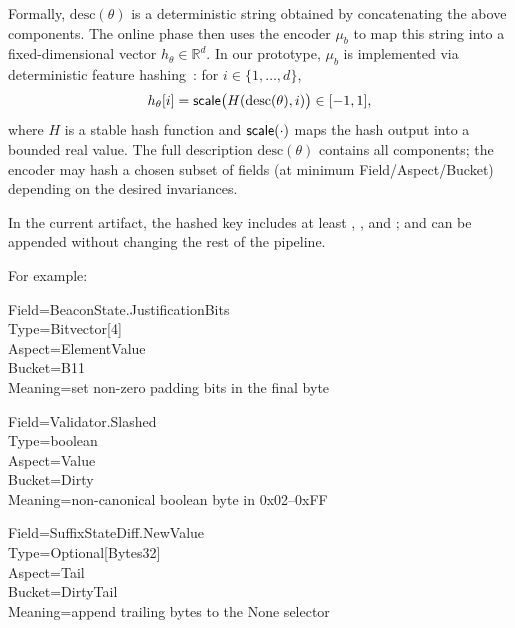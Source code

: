 Formally, $\text{desc}(\theta)$ is a deterministic string obtained by concatenating the above components.
The online phase then uses the encoder $\mu_b$ to map this string into a fixed-dimensional vector $h_\theta \in \mathbb{R}^d$.
In our prototype, $\mu_b$ is implemented via deterministic feature hashing~\cite{weinberger2009featurehashing}: for $i\in\{1,\ldots,d\}$,
\[
    h_\theta[i] = {\sf scale}\big(H(\text{desc}(\theta), i)\big) \in [-1,1],
\]
where $H$ is a stable hash function and ${\sf scale}(\cdot)$ maps the hash output into a bounded real value. The full description $\text{desc}(\theta)$ contains all components; the encoder may hash a chosen subset of fields (at minimum Field/Aspect/Bucket) depending on the desired invariances.

In the current artifact, the hashed key includes at least , , and ;  and  can be appended without changing the rest of the pipeline.

For example:

\begin{mdframed}[
    backgroundcolor=gray!10,
    linecolor=white,
    skipabove=0.3em,
    skipbelow=0.2em
    ]
\noindent\ttfamily\small
Field=BeaconState.\allowbreak JustificationBits \\
Type=Bitvector[4] \\
Aspect=ElementValue \\
Bucket=B11 \\
Meaning=set non-zero padding bits in the final byte
\end{mdframed}

\begin{mdframed}[
    backgroundcolor=gray!10,
    linecolor=white,
    skipabove=0.2em,
    skipbelow=0.2em
    ]
\noindent\ttfamily\small
Field=Validator.\allowbreak Slashed \\
Type=boolean \\
Aspect=Value \\
Bucket=Dirty \\
Meaning=non-canonical boolean byte in 0x02--0xFF
\end{mdframed}

\begin{mdframed}[
    backgroundcolor=gray!10,
    linecolor=white,
    skipabove=0.2em,
    skipbelow=0.2em
    ]
\noindent\ttfamily\small
Field=SuffixStateDiff.\allowbreak NewValue \\
Type=Optional[Bytes32] \\
Aspect=Tail \\
Bucket=DirtyTail \\
Meaning=append trailing bytes to the None selector
\end{mdframed}

